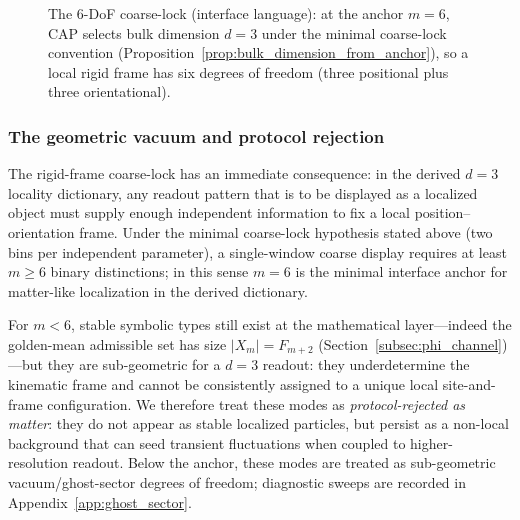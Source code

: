 \begin{figure}[t]
\centering
{}
\caption{The 6-DoF coarse-lock (interface language): at the anchor $m=6$, CAP selects bulk dimension $d=3$ under the minimal coarse-lock convention (Proposition~\ref{prop:bulk_dimension_from_anchor}), so a local rigid frame has six degrees of freedom (three positional plus three orientational).}
\label{fig:6dof_lock}
\end{figure}

\subsubsection{The geometric vacuum and protocol rejection}
\label{subsubsec:geometric_vacuum}
The rigid-frame coarse-lock has an immediate consequence: in the derived $d=3$ locality dictionary, any readout pattern that is to be displayed as a localized object must supply enough independent information to fix a local position--orientation frame.
Under the minimal coarse-lock hypothesis stated above (two bins per independent parameter), a single-window coarse display requires at least $m\ge 6$ binary distinctions; in this sense $m=6$ is the minimal interface anchor for matter-like localization in the derived dictionary.

For $m<6$, stable symbolic types still exist at the mathematical layer---indeed the golden-mean admissible set has size $|X_m|=F_{m+2}$ (Section~\ref{subsec:phi_channel})---but they are sub-geometric for a $d=3$ readout: they underdetermine the kinematic frame and cannot be consistently assigned to a unique local site-and-frame configuration.
We therefore treat these modes as \emph{protocol-rejected as matter}: they do not appear as stable localized particles, but persist as a non-local background that can seed transient fluctuations when coupled to higher-resolution readout.
\InterfaceTag Below the anchor, these modes are treated as sub-geometric vacuum/ghost-sector degrees of freedom; diagnostic sweeps are recorded in Appendix~\ref{app:ghost_sector}.

